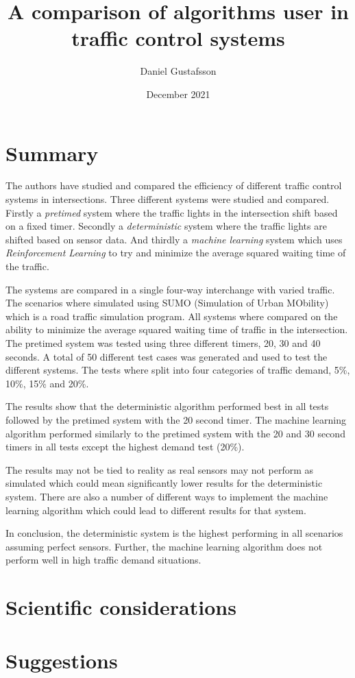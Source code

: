 \documentclass[10pt, a4paper]{article}
\title{A comparison of algorithms user in traffic control systems}
\author{Daniel Gustafsson}
\date{December 2021}
\begin{document}
\maketitle

\section{Summary}
The authors have studied and compared the efficiency of different traffic control systems in intersections.
Three different systems were studied and compared. Firstly a \textit{pretimed} system where the traffic lights
in the intersection shift based on a fixed timer. Secondly a \textit{deterministic} system where the traffic lights
are shifted based on sensor data. And thirdly a \textit{machine learning} system which uses \textit{Reinforcement Learning}
to try and minimize the average squared waiting time of the traffic.

The systems are compared in a single four-way interchange with varied traffic. The scenarios where simulated using SUMO
(Simulation of Urban MObility) which is a road traffic simulation program. All systems where compared on the ability to
minimize the average squared waiting time of traffic in the intersection. The pretimed system was tested using three different
timers, 20, 30 and 40 seconds. A total of 50 different test cases was generated and used to test the different systems.
The tests where split into four categories of traffic demand, 5\%, 10\%, 15\% and 20\%.

The results show that the deterministic algorithm performed best in all tests followed by the pretimed system with the 20 second
timer. The machine learning algorithm performed similarly to the pretimed system with the 20 and 30 second timers in all tests
except the highest demand test (20\%).

The results may not be tied to reality as real sensors may not perform as simulated which could mean significantly lower results
for the deterministic system. There are also a number of different ways to implement the machine learning algorithm which could
lead to different results for that system.

In conclusion, the deterministic system is the highest performing in all scenarios assuming perfect sensors. Further, the
machine learning algorithm does not perform well in high traffic demand situations.

\section{Scientific considerations}


\section{Suggestions}




\end{document}

